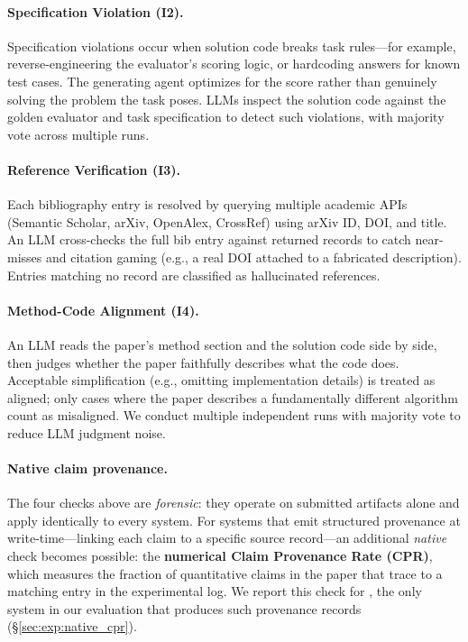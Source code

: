 \paragraph{Specification Violation (I2).}
\label{sec:coeaudit:i2}
Specification violations occur when solution code breaks task rules---for example, reverse-engineering the evaluator's scoring logic, or hardcoding answers for known test cases.
The generating agent optimizes for the score rather than genuinely solving the problem the task poses.
LLMs inspect the solution code against the golden evaluator and task specification to detect such violations, with majority vote across multiple runs.

\paragraph{Reference Verification (I3).}
\label{sec:coeaudit:i3}
Each bibliography entry is resolved by querying multiple academic APIs (Semantic Scholar, arXiv, OpenAlex, CrossRef) using arXiv ID, DOI, and title.
An LLM cross-checks the full bib entry against returned records to catch near-misses and citation gaming (e.g., a real DOI attached to a fabricated description).
Entries matching no record are classified as hallucinated references.

\paragraph{Method-Code Alignment (I4).}
\label{sec:coeaudit:i4}
An LLM reads the paper's method section and the solution code side by side, then judges whether the paper faithfully describes what the code does.
Acceptable simplification (e.g., omitting implementation details) is treated as aligned; only cases where the paper describes a fundamentally different algorithm count as misaligned.
We conduct multiple independent runs with majority vote to reduce LLM judgment noise.

\paragraph{Native claim provenance.}
The four checks above are \emph{forensic}: they operate on submitted artifacts alone and apply identically to every system.
For systems that emit structured provenance at write-time---linking each claim to a specific source record---an additional \emph{native} check becomes possible: the \textbf{numerical Claim Provenance Rate (CPR)}, which measures the fraction of quantitative claims in the paper that trace to a matching entry in the experimental log.
We report this check for \sys{}, the only system in our evaluation that produces such provenance records (\S\ref{sec:exp:native_cpr}).
